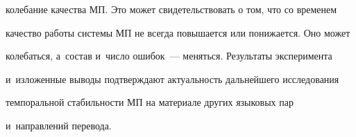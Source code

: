 колебание качества МП. Это может свидетельствовать о том, что со временем 


качество работы системы МП не всегда повышается или понижается. Оно может 


колебаться, а~состав и~число ошибок~--- меняться. Результаты эксперимента 


и~изложенные выводы подтверждают актуальность дальнейшего исследования 


темпоральной стабильности МП на материале других языковых пар 


и~направлений перевода.





\vspace*{-4pt}


  


